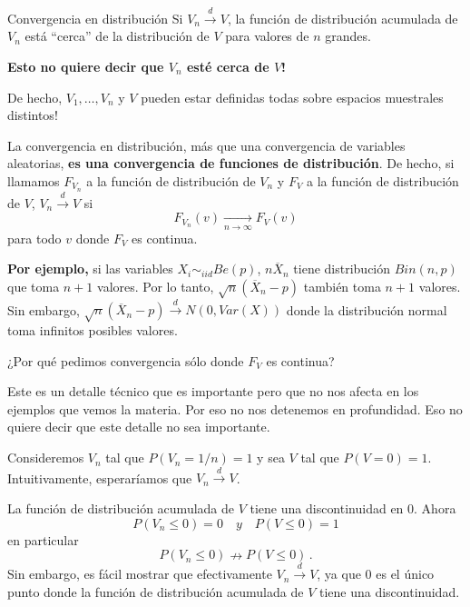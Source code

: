 \documentclass{beamer}
\theoremstyle{definition}
\newcommand{\ton}{\underset{n\to\infty}{\longrightarrow}}
\newcommand{\cw}{\overset{d}{\rightarrow}}
\begin{document}
\begin{frame}[noframenumbering]{\color{rosee}Convergencia en distribuci\'on}
    Si $V_n\cw V$, la funci\'on de distribuci\'on acumulada de $V_n$
    est\'a ``cerca'' de la distribuci\'on de $V$ para valores de $n$
    grandes.

    \medskip\textbf{Esto no quiere decir que $V_n$ est\'e cerca de $V$!}\small

    \medskip De hecho, $V_{1},\dots, V_n$ y $V$ pueden estar definidas
    todas sobre espacios muestrales distintos!

    \medskip La convergencia en distribuci\'on, m\'as que una
    convergencia de variables aleatorias, \textbf{es una convergencia de
    funciones de distribuci\'on}. De hecho, si llamamos $F_{V_n}$ a la
    funci\'on de distribuci\'on de $V_n$ y $F_{V}$ a la funci\'on de
    distribuci\'on de $V$, $V_n\cw V$ si
    \[F_{V_n}(v) \ton F_{V}(v)\]
    para todo $v$ donde $F_{V}$ es continua.
    
    \textbf{Por ejemplo, }si las variables $X_i\sim_{iid} Be(p)$, $n\overline{X}_n$ tiene distribución $Bin(n,p)$ que toma $n+1$ valores. Por lo tanto, 
    $\sqrt{n}(\overline{X}_n-p)$ también toma $n+1$ valores. Sin embargo, $\sqrt{n}(\overline{X}_n-p)\cw N(0,Var(X))$ donde la distribución normal toma infinitos posibles valores.
\end{frame}

\begin{frame}[noframenumbering]{\color{rosee}¿Por qu\'e pedimos convergencia s\'olo donde
      $F_{V}$ es continua?}
      
      Este es un detalle técnico que es importante pero que no nos afecta en los ejemplos que vemos la materia. Por eso no nos detenemos en profundidad. Eso no quiere decir que este detalle no sea importante.
  \begin{alertblock}{}


    Consideremos $V_n$ tal que $P(V_n=1/n)=1$ y sea $V$ tal que
    $P(V=0)=1$. Intuitivamente, esperar\'iamos que $V_n\cw V$.

    \medskip La funci\'on de distribuci\'on acumulada de $V$ tiene una
    discontinuidad en 0. Ahora
    \[P(V_n\leq 0) =0 \quad y \quad P(V\leq 0)=1\]
    en particular
    \[P(V_n\leq 0) \nrightarrow P(V\leq 0)\,.\]
    Sin embargo, es f\'acil mostrar que efectivamente $V_n \cw V$, ya
    que $0$ es el \'unico punto donde la funci\'on de distribuci\'on
    acumulada de $V$ tiene una discontinuidad.
  \end{alertblock}
\end{frame}
\end{document}
